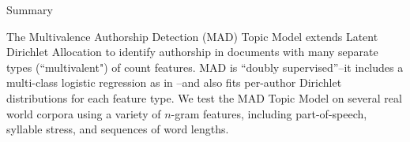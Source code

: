\documentclass[final]{beamer}
\newlength{\onecolwid}
\newlength{\twocolwid}
\begin{document}
\begin{frame}[t]
\begin{columns}[t]
\begin{column}{\twocolwid}

\begin{alertblock}{Summary}

The Multivalence Authorship Detection (MAD) Topic Model extends Latent Dirichlet Allocation \citep{Blei2003} to identify authorship in documents with many separate types (``multivalent") of count features. MAD is ``doubly supervised''--it includes a multi-class logistic regression as in \cite{Blei2007}--and also fits per-author Dirichlet distributions for each feature type. We test the MAD Topic Model on several real world corpora using a variety of $n$-gram features, including part-of-speech, syllable stress, and sequences of word lengths.
\end{alertblock} 


\begin{columns}[t,totalwidth=\twocolwid] %

\begin{column}{\onecolwid} %



\end{column}
\end{columns}
\end{column}
\end{columns}
\end{frame}
\end{document}
